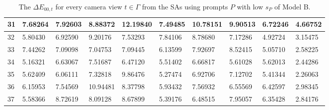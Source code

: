 \begin{table}[H]
{\begin{tabular}{|l|l|l|l|l|l|l|l|l|l|}
        31 & 7.68264 & 7.92603 & 8.88372 & 12.19840 & 7.49485 & 10.78151 & 9.90513 & 6.72246 & 4.66752 \\ \hline
        32 & 5.80430 & 6.92590 & 9.20176 & 7.53293 & 7.84106 & 8.78680 & 7.17286 & 4.92724 & 3.15475 \\ \hline
        33 & 7.44262 & 7.09098 & 7.04753 & 7.09445 & 6.13599 & 7.92697 & 8.52415 & 5.05710 & 2.58225 \\ \hline
        34 & 5.16321 & 6.63067 & 7.51687 & 6.47120 & 5.51402 & 6.66817 & 5.61028 & 5.62013 & 2.44286 \\ \hline
        35 & 5.62409 & 6.06111 & 7.32818 & 9.86476 & 5.27474 & 6.92706 & 7.12702 & 5.41344 & 2.26063 \\ \hline
        36 & 6.15953 & 7.54569 & 10.94481 & 8.37798 & 5.93432 & 7.56932 & 6.55569 & 6.42597 & 2.98345 \\ \hline
        37 & 5.58366 & 8.72619 & 8.09128 & 8.67899 & 5.39176 & 6.48515 & 7.95057 & 6.35428 & 2.84176 \\ \hline
    \end{tabular}}
	\caption{The $ \Delta E_{00,t}$ for every camera view $t \in \varGamma$ from the SAs using prompts $P$ with low $s_P$ of Model B.}
\end{table}

